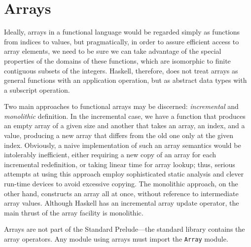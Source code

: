 
\section{Arrays}
Ideally, arrays in a functional language would be regarded simply as
functions from indices to values, but pragmatically, in order to
assure efficient access to array elements, we need to
be sure we can take advantage of the special properties of the domains
of these functions, which are isomorphic to finite contiguous subsets
of the integers.  Haskell, therefore, does not treat arrays as general
functions with an application operation, but as abstract data types
with a subscript operation.

Two main approaches to functional arrays may be discerned: {\em
incremental} and {\em monolithic} definition.  In the incremental
case, we have a function that produces an empty array of a given size
and another that takes an array, an index, and a value, producing a
new array that differs from the old one only at the given index.
Obviously, a naive implementation of such an array semantics would be
intolerably inefficient, either requiring a new copy of an array for each
incremental redefinition, or taking linear time for array lookup; thus, serious attempts at using this
approach employ sophisticated static analysis and clever run-time
devices to avoid excessive copying.  The monolithic approach, on the
other hand, constructs an array all at once, without reference to
intermediate array values.  Although Haskell has an incremental array
update operator, the main thrust of the array facility is monolithic.

Arrays are not part of the Standard Prelude---the standard library
contains the array operators.  Any module using 
arrays must import the \mbox{\tt Array} module.

